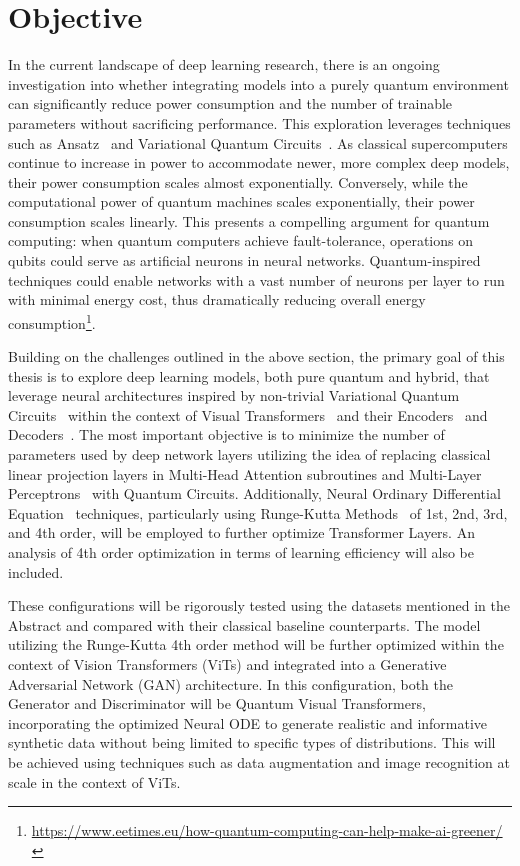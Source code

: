 \documentclass[12pt,a4paper]{report}
\begin{document}
\section{Objective}\vspace{-15pt}
In the current landscape of deep learning research, there is an ongoing investigation into whether integrating models into a purely quantum environment can significantly reduce power consumption and the number of trainable parameters without sacrificing performance. This exploration leverages techniques such as Ansatz~\cite{hadfield2019quantum} and Variational Quantum Circuits~\cite{cerezo2021variational}. As classical supercomputers continue to increase in power to accommodate newer, more complex deep models, their power consumption scales almost exponentially. Conversely, while the computational power of quantum machines scales exponentially, their power consumption scales linearly. This presents a compelling argument for quantum computing: when quantum computers achieve fault-tolerance, operations on qubits could serve as artificial neurons in neural networks. Quantum-inspired techniques could enable networks with a vast number of neurons per layer to run with minimal energy cost, thus dramatically reducing overall energy consumption\footnote{\url{https://www.eetimes.eu/how-quantum-computing-can-help-make-ai-greener/}}.

Building on the challenges outlined in the above section, the primary goal of this thesis is to explore deep learning models, both pure quantum and hybrid, that leverage neural architectures inspired by non-trivial Variational Quantum Circuits~\cite{cerezo2021variational} within the context of Visual Transformers~\cite{vaswani2017attention} and their Encoders~\cite{hinton2011transforming} and Decoders~\cite{breuckmann2018scalable}. The most important objective is to minimize the number of parameters used by deep network layers utilizing the idea of replacing classical linear projection layers in Multi-Head Attention subroutines and Multi-Layer Perceptrons~\cite{popescu2009multilayer} with Quantum Circuits. Additionally, Neural Ordinary Differential Equation~\cite{zhong2022neural}\cite{li2022ode} techniques, particularly using Runge-Kutta Methods~\cite{butcher1996history} of 1st, 2nd, 3rd, and 4th order, will be employed to further optimize Transformer Layers. An analysis of 4th order optimization in terms of learning efficiency will also be included.

These configurations will be rigorously tested using the datasets mentioned in the Abstract and compared with their classical baseline counterparts. The model utilizing the Runge-Kutta 4th order method will be further optimized within the context of Vision Transformers (ViTs) and integrated into a Generative Adversarial Network (GAN) architecture. In this configuration, both the Generator and Discriminator will be Quantum Visual Transformers, incorporating the optimized Neural ODE to generate realistic and informative synthetic data without being limited to specific types of distributions. This will be achieved using techniques such as data augmentation and image recognition at scale in the context of ViTs.
\end{document}
